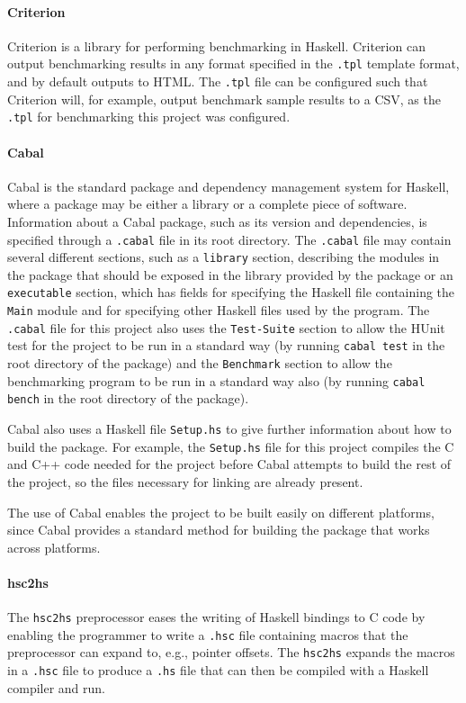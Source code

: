 \documentclass[12pt,a4paper,twoside,openright]{report}
\begin{document}
\paragraph{Criterion}{
Criterion is a library for performing benchmarking in Haskell.
Criterion can output benchmarking results in any format specified in the \verb,.tpl,
template format, and by default outputs to HTML.
The \verb,.tpl, file can be configured such that
Criterion will, for example, output benchmark sample results to a CSV, as the
\verb,.tpl, for benchmarking this project was configured.}

\paragraph{Cabal}{
Cabal is the standard package and dependency management system for Haskell,
where a package may be either a library or a complete piece of software.
Information about a Cabal package, such as its version and dependencies,
is specified through a \verb,.cabal, file in its root directory.
The \verb,.cabal, file may contain several different sections, such as a
\verb,library, section, describing the modules in the package that should be
exposed in the library provided by the package or an \verb,executable, section,
which has fields for specifying the Haskell file containing the \verb,Main,
module and for specifying other Haskell files used by the program.
The \verb,.cabal, file for this project also uses the \verb,Test-Suite, section
to allow the HUnit test for the project to be run in a standard way (by running
\verb,cabal test, in the root directory of the package) and the \verb,Benchmark,
section to allow the benchmarking program to be run in a standard way also
(by running \verb,cabal bench, in the root directory of the package).

Cabal also uses a Haskell file \verb,Setup.hs, to give further information
about how to build the package. For example, the \verb,Setup.hs, file
for this project compiles the C and C++ code needed for the project before
Cabal attempts to build the rest of the project, so the files necessary
for linking are already present.

The use of Cabal enables the project to be built easily on different platforms,
since Cabal provides a standard method for building the package that works
across platforms.}

\paragraph{hsc2hs}{
The \verb,hsc2hs, preprocessor eases the writing of Haskell bindings to C
code by enabling the programmer to write a \verb,.hsc, file containing
macros that the preprocessor can expand to, e.g., pointer offsets. The
\verb,hsc2hs, expands the macros in a \verb,.hsc, file to produce a
\verb,.hs, file that can then be compiled with a Haskell compiler and run.
}
\end{document}
